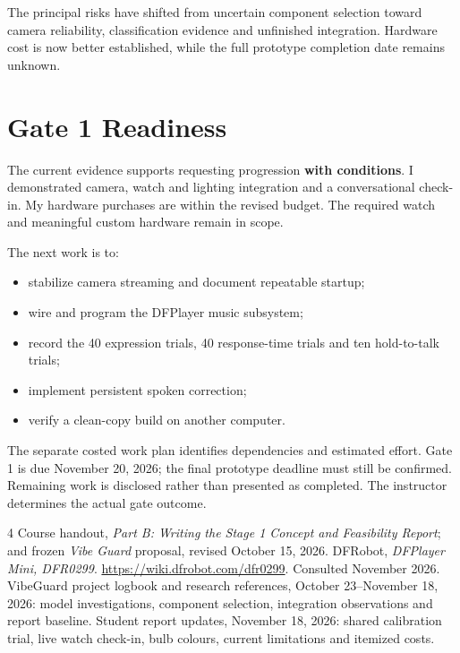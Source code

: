\documentclass[conference,letterpaper]{IEEEtran}
\begin{document}
The principal risks have shifted from uncertain component selection
toward camera reliability, classification evidence and unfinished
integration. Hardware cost is now better established, while the
full prototype completion date remains unknown.

\section{Gate 1 Readiness}

The current evidence supports requesting progression
\textbf{with conditions}. I demonstrated camera, watch and lighting
integration and a conversational check-in. My hardware purchases
are within the revised budget.
The required watch and meaningful custom hardware remain in scope.

The next work is to:
\begin{itemize}
\item stabilize camera streaming and document repeatable startup;
\item wire and program the DFPlayer music subsystem;
\item record the 40 expression trials, 40 response-time trials
and ten hold-to-talk trials;
\item implement persistent spoken correction;
\item verify a clean-copy build on another computer.
\end{itemize}

\begin{samepage}
The separate costed work plan identifies dependencies and estimated
effort. Gate 1 is due November 20, 2026; the final prototype deadline
must still be confirmed. Remaining work is disclosed rather than
presented as completed. The instructor determines the actual gate outcome.
\end{samepage}



\begin{thebibliography}{4}
 Course handout,
\emph{Part B: Writing the Stage 1 Concept and Feasibility Report};
and frozen \emph{Vibe Guard} proposal, revised October 15, 2026.
 DFRobot, \emph{DFPlayer Mini, DFR0299}.
\url{https://wiki.dfrobot.com/dfr0299}.
Consulted November 2026.
 VibeGuard project logbook and research references,
October 23--November 18, 2026: model investigations, component
selection, integration observations and report baseline.
 Student report updates, November 18, 2026:
shared calibration trial, live watch check-in,
bulb colours, current limitations and itemized costs.
\end{thebibliography}
\end{document}
